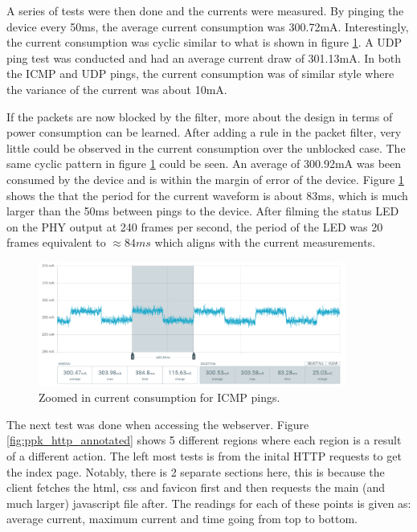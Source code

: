 A series of tests were then done and the currents were measured. By pinging the device every 50ms, the average current consumption was 300.72mA. Interestingly, the current consumption was cyclic similar to what is shown in figure \ref{fig:ppk_icmp_ping}. A UDP ping test was conducted and had an average current draw of 301.13mA. In both the ICMP and UDP pings, the current consumption was of similar style where the variance of the current was about 10mA. 


If the packets are now blocked by the filter, more about the design in terms of power consumption can be learned. After adding a rule in the packet filter, very little could be observed in the current consumption over the unblocked case. The same cyclic pattern in figure \ref{fig:ppk_icmp_ping} could be seen. An average of 300.92mA was been consumed by the device and is within the margin of error of the device. Figure \ref{fig:ppk_icmp_ping} shows the that the period for the current waveform is about 83ms, which is much larger than the 50ms between pings to the device. After filming the status LED on the PHY output at 240 frames per second, the period of the LED was 20 frames equivalent to $\approx 84ms$ which aligns with the current measurements. 


\begin{figure}[h]
    \centering
    \includegraphics[width=0.9\textwidth]{Images/PPK_ping_zoom.png}
    \caption[Zoomed in current consumption for ICMP pings]{Zoomed in current consumption for ICMP pings.}
    \label{fig:ppk_icmp_ping}
\end{figure}



The next test was done when accessing the webserver. Figure \ref{fig:ppk_http_annotated} shows 5 different regions where each region is a result of a different action. The left most tests is from the inital HTTP requests to get the index page. Notably, there is 2 separate sections here, this is because the client fetches the html, css and favicon first and then requests the main (and much larger) javascript file after. The readings for each of these points is given as: average current, maximum current and time going from top to bottom. 

